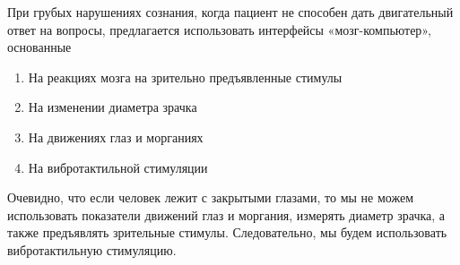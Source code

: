 
При грубых нарушениях сознания, когда пациент не способен дать двигательный ответ на вопросы, предлагается использовать интерфейсы «мозг-компьютер», основанные

\begin{enumerate}
    \item На реакциях мозга на зрительно предъявленные стимулы
    \item На изменении диаметра зрачка
    \item На движениях глаз и морганиях
    \item На вибротактильной стимуляции
\end{enumerate}

\explanationSection

Очевидно, что если человек лежит с закрытыми глазами, то мы не можем использовать показатели движений глаз и моргания, измерять диаметр зрачка, а также предъявлять зрительные стимулы.
Следовательно, мы будем использовать вибротактильную стимуляцию.

